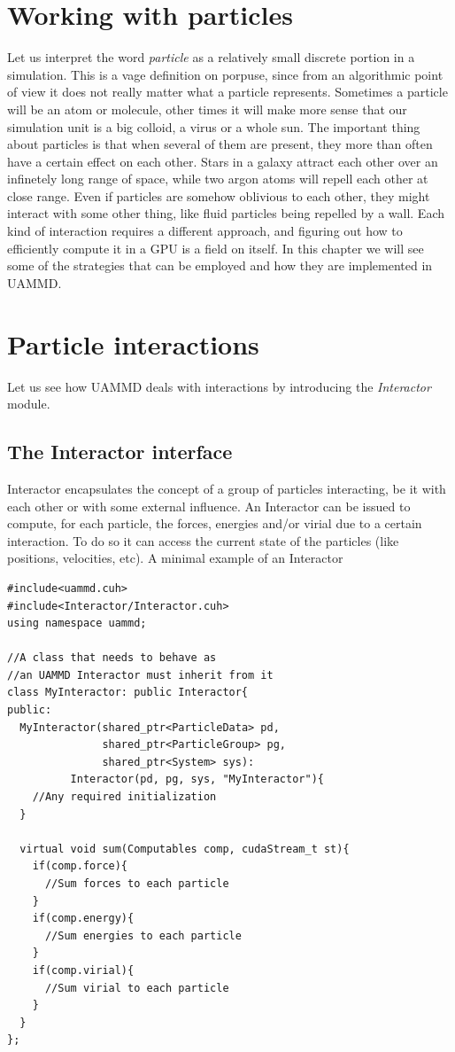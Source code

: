 \documentclass[ twoside,openright,titlepage,numbers=noenddot,%
headinclude,footinclude,cleardoublepage=empty,abstract=on,
BCOR=5mm,paper=a4,fontsize=11pt, dvipsnames
]{scrreprt}
\newcommand{\uammd}{\gls{UAMMD}\xspace}
\newcommand{\gpu}{\gls{GPU}\xspace}
\begin{document}
\chapter{Working with particles}
Let us interpret the word \emph{particle} as a relatively small discrete portion in a simulation. This is a vage definition on porpuse, since from an algorithmic point of view it does not really matter what a particle represents. Sometimes a particle will be an atom or molecule, other times it will make more sense that our simulation unit is a big colloid, a virus or a whole sun.
The important thing about particles is that when several of them are present, they more than often have a certain effect on each other.
Stars in a galaxy attract each other over an infinetely long range of space, while two argon atoms will repell each other at close range.
Even if particles are somehow oblivious to each other, they might interact with some other thing, like fluid particles being repelled by a wall.
Each kind of interaction requires a different approach, and figuring out how to efficiently compute it in a \gpu is a field on itself. 
In this chapter we will see some of the strategies that can be employed and how they are implemented in \uammd.

\chapter{Particle interactions}

Let us see how \uammd deals with interactions by introducing the \emph{Interactor} module.

\section{The Interactor interface} \label{sec:interactor}

Interactor encapsulates the concept of a group of particles interacting, be it with each other or with some external influence.
An Interactor can be issued to compute, for each particle, the forces, energies and/or virial due to a certain interaction.
To do so it can access the current state of the particles (like positions, velocities, etc).
A minimal example of an Interactor

\begin{verbatim}
#include<uammd.cuh>
#include<Interactor/Interactor.cuh>
using namespace uammd;

//A class that needs to behave as 
//an UAMMD Interactor must inherit from it
class MyInteractor: public Interactor{
public:
  MyInteractor(shared_ptr<ParticleData> pd,
               shared_ptr<ParticleGroup> pg,
               shared_ptr<System> sys):
          Interactor(pd, pg, sys, "MyInteractor"){
    //Any required initialization 
  }

  virtual void sum(Computables comp, cudaStream_t st){
    if(comp.force){
      //Sum forces to each particle
    }
    if(comp.energy){
      //Sum energies to each particle
    }
    if(comp.virial){
      //Sum virial to each particle
    }
  }
};
\end{verbatim}
\end{document}
